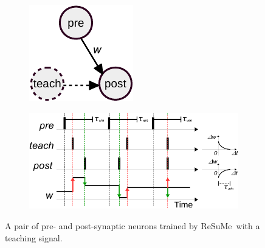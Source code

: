 \begin{figure}
	\centering
	\begin{subfigure}[c]{0.25\textwidth}
		\includegraphics[width=\textwidth]{pics_sdlm/resume.pdf}
	\end{subfigure}
		\begin{subfigure}[c]{0.7\textwidth}
			\includegraphics[width=\textwidth]{pics_sdlm/resume2.pdf}
		\end{subfigure}
	\caption{A pair of pre- and post-synaptic neurons trained by ReSuMe~\DIFdelbeginFL {}\DIFdelendFL \DIFaddbeginFL {}\DIFaddendFL with a teaching signal.}
	\label{fig:resume}
\end{figure}

